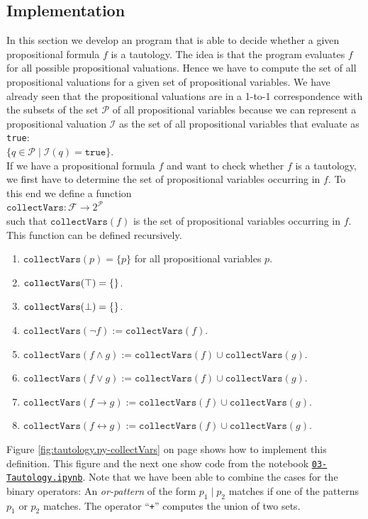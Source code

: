 \subsection{\texorpdfstring{\Fsharp}{F\#} Implementation}
In this section we develop an \Fsharp{} program that is able to decide whether a given propositional
formula $f$ is a tautology.  The idea is that the program evaluates $f$ for all possible propositional
valuations.  Hence we have to compute the set of all propositional valuations for a given set of
propositional variables.  We have already seen that the propositional valuations are in a 1-to-1
correspondence with the subsets of the set $\mathcal{P}$ of all propositional variables because we can
represent a propositional valuation $\mathcal{I}$ as the set of all propositional variables that evaluate
as \texttt{true}:
\\[0.2cm]
\hspace*{1.3cm}
$\bigl\{ q \in \mathcal{P} \mid \mathcal{I}(q) = \mathtt{true} \bigr\}$.
\\[0.2cm]
If we have a propositional formula $f$ and want to check whether $f$ is a tautology, we first have to determine
the set of propositional variables occurring in $f$.
To this end we define a function
\\[0.2cm]
\hspace*{1.3cm}
$\texttt{collectVars}: \mathcal{F} \rightarrow 2^{\mathcal{P}}$
\\[0.2cm]
such that $\mathtt{collectVars}(f)$ is the set of propositional variables occurring in $f$.  This function can
be defined recursively.
\begin{enumerate}
\item $\mathtt{collectVars}(p) = \{ p \}$ \quad for all propositional variables $p$.
\item $\mathtt{collectVars}(\top) = \{\}$.
\item $\mathtt{collectVars}(\bot) = \{\}$.
\item $\mathtt{collectVars}(\neg f) := \mathtt{collectVars}(f)$.
\item $\mathtt{collectVars}(f \wedge g) := \mathtt{collectVars}(f) \cup \mathtt{collectVars}(g)$.
\item $\mathtt{collectVars}(f \vee g) := \mathtt{collectVars}(f) \cup \mathtt{collectVars}(g)$.
\item $\mathtt{collectVars}(f \rightarrow g) := \mathtt{collectVars}(f) \cup \mathtt{collectVars}(g)$.
\item $\mathtt{collectVars}(f \leftrightarrow g) := \mathtt{collectVars}(f) \cup \mathtt{collectVars}(g)$.
\end{enumerate}
Figure \ref{fig:tautology.py-collectVars} on page \pageref{fig:tautology.py-collectVars} shows how to implement
this definition.  This figure and the next one show code from the notebook
\href{https://github.com/karlstroetmann/Logic/blob/master/F-Sharp/Chapter-4/03-Tautology.ipynb}{\texttt{03-Tautology.ipynb}}.
Note that we have been able to combine the cases for the binary operators:  An \textsl{or-pattern} of the form
$p_1 \mid p_2$ matches if one of the patterns $p_1$ or $p_2$ matches.  The operator ``\texttt{+}'' computes the
union of two sets.

